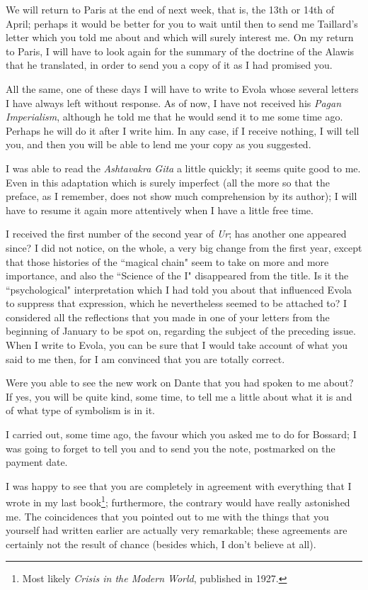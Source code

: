 We will return to Paris at the end of next week, that is, the 13th or 14th of April; perhaps it would be better for you
to wait until then to send me Taillard's letter which you told me about and which will surely
interest me. On my return to Paris, I will have to look again for the summary of the doctrine of the Alawis that he
translated, in order to send you a copy of it as I had promised you.

All the same, one of these days I will have to write to Evola whose several letters I have always left without response.
As of now, I have not received his \emph{Pagan Imperialism}, although he told me that he would send it to me some time
ago. Perhaps he will do it after I write him. In any case, if I receive nothing, I will tell you, and then you will be
able to lend me your copy as you suggested.

I was able to read the \emph{Ashtavakra Gita} a little quickly; it seems quite good to me. Even in this adaptation which
is surely imperfect (all the more so that the preface, as I remember, does not show much comprehension by its author);
I will have to resume it again more attentively when I have a little free time.

I received the first number of the second year of \emph{Ur}; has another one appeared since? I did not notice, on the
whole, a very big change from the first year, except that those histories of the ``magical chain" seem to take on more
and more importance, and also the ``Science of the I" disappeared from the title. Is it the ``psychological"
interpretation which I had told you about that influenced Evola to suppress that expression, which he nevertheless
seemed to be attached to? I considered all the reflections that you made in one of your letters from the beginning of
January to be spot on, regarding the subject of the preceding issue. When I write to Evola, you can be sure that I
would take account of what you said to me then, for I am convinced that you are totally correct.

Were you able to see the new work on Dante that you had spoken to me about? If yes, you will be quite kind, some time,
to tell me a little about what it is and of what type of symbolism is in it.

I carried out, some time ago, the favour which you asked me to do for Bossard; I was going to forget to tell you and to
send you the note, postmarked on the payment date.

I was happy to see that you are completely in agreement with everything that I wrote in my last book\footnote{Most likely \emph{Crisis in the Modern World}, published in 1927.}; furthermore, the contrary would have really astonished me. The
coincidences that you pointed out to me with the things that you yourself had written earlier are actually very
remarkable; these agreements are certainly not the result of chance (besides which, I don't
believe at all).

